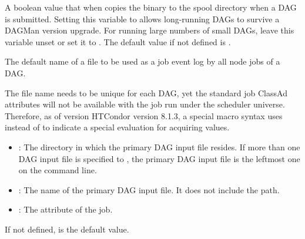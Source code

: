 \begin{description}
\label{param:DAGManCopyToSpool}
\item[\Macro{DAGMAN\_COPY\_TO\_SPOOL}]
  A boolean value that when  copies the  binary
  to the spool directory when a DAG is submitted.
  Setting this variable to  allows
  long-running DAGs to survive a DAGMan version upgrade.
  For running large numbers of small DAGs, leave this
  variable unset or set it to .
  The default value if not defined is .

\label{param:DAGManDefaultNodeLog}
\item[\Macro{DAGMAN\_DEFAULT\_NODE\_LOG}]
  The default name of a file to be used as a job event log by all node jobs
  of a DAG.

  The file name needs to be unique for each DAG,
  yet the standard job ClassAd attributes will not be available 
  with the  job run under the scheduler universe. 
  Therefore, as of version HTCondor version 8.1.3, 
  a special macro syntax 
  uses  instead of \Bold{\Expr{\$}} to indicate
  a special evaluation for acquiring values.
  \begin{itemize}
  \item {}: The directory in which the primary DAG input file
  resides.
  If more than one DAG input file is specified to ,
  the primary DAG input file is the leftmost one on the command line.
  \item {}: The name of the primary DAG input file.
  It does not include the path.
  \item {}: The  attribute of 
  the  job.
  \end{itemize}

  If not defined, 
   is the default value.


\end{description}
